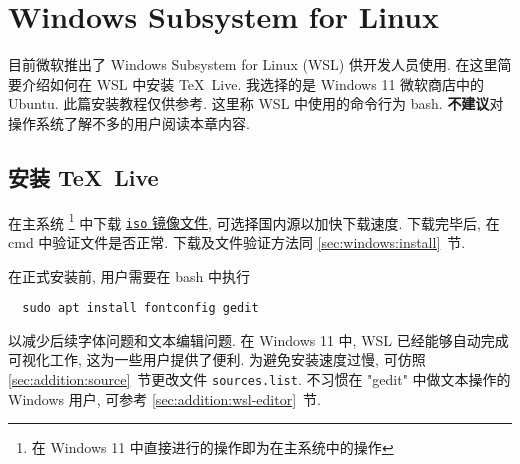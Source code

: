 
\chapter{Windows Subsystem for Linux}

目前微软推出了 Windows Subsystem for Linux (WSL) 供开发人员使用.
在这里简要介绍如何在 WSL 中安装 \TeX\ Live.
我选择的是 Windows 11 微软商店中的 Ubuntu.
此篇安装教程仅供参考.
这里称 WSL 中使用的命令行为 \textsf{bash}.
\textbf{不建议}对操作系统了解不多的用户阅读本章内容.

\section{安装 \TeX\ Live}

在主系统%
\footnote{在 Windows 11 中直接进行的操作即为在主系统中的操作}%
中下载
\href{https://mirrors.ctan.org/systems/texlive/Images/texlive2025.iso}{\texttt{iso} 镜像文件},
可选择国内源以加快下载速度.
下载完毕后, 在 \textsf{cmd} 中验证文件是否正常.
下载及文件验证方法同 \ref{sec:windows:install}~节.

在正式安装前,
用户需要在 \textsf{bash} 中执行
\begin{lstlisting}
  sudo apt install fontconfig gedit
\end{lstlisting}
以减少后续字体问题和文本编辑问题.
在 Windows 11 中,
WSL 已经能够自动完成可视化工作,
这为一些用户提供了便利.
为避免安装速度过慢,
可仿照 \ref{sec:addition:source}~节更改文件 \texttt{sources.list}.
不习惯在 "gedit" 中做文本操作的 Windows 用户,
可参考 \ref{sec:addition:wsl-editor}~节.


